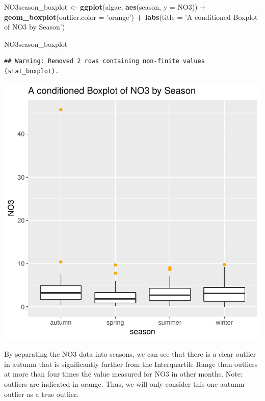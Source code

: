 \documentclass[]{article}
\newenvironment{Shaded}{\begin{snugshade}}{\end{snugshade}}
\newcommand{\KeywordTok}[1]{\textcolor[rgb]{0.13,0.29,0.53}{\textbf{#1}}}
\newcommand{\DataTypeTok}[1]{\textcolor[rgb]{0.13,0.29,0.53}{#1}}
\newcommand{\StringTok}[1]{\textcolor[rgb]{0.31,0.60,0.02}{#1}}
\newcommand{\OperatorTok}[1]{\textcolor[rgb]{0.81,0.36,0.00}{\textbf{#1}}}
\newcommand{\NormalTok}[1]{#1}
\begin{document}
\begin{Shaded}
\begin{Highlighting}[]
\NormalTok{NO3season_boxplot <-}\StringTok{ }\KeywordTok{ggplot}\NormalTok{(algae, }\KeywordTok{aes}\NormalTok{(season, }\DataTypeTok{y =}\NormalTok{ NO3)) }\OperatorTok{+}
\StringTok{  }\KeywordTok{geom_boxplot}\NormalTok{(}\DataTypeTok{outlier.color =} \StringTok{'orange'}\NormalTok{) }\OperatorTok{+}
\StringTok{  }\KeywordTok{labs}\NormalTok{(}\DataTypeTok{title =} \StringTok{'A conditioned Boxplot of NO3 by Season'}\NormalTok{)}

\NormalTok{NO3season_boxplot}
\end{Highlighting}
\end{Shaded}

\begin{verbatim}
## Warning: Removed 2 rows containing non-finite values (stat_boxplot).
\end{verbatim}

\begin{center}\includegraphics{homework1-handout_files/figure-latex/unnamed-chunk-2-2} \end{center}

By separating the NO3 data into seasons, we can see that there is a
clear outlier in autumn that is significantly further from the
Interquartile Range than outliers at more than four times the value
measured for NO3 in other months. Note: outliers are indicated in
orange. Thus, we will only consider this one autumn outlier as a true
outlier.
\end{document}
